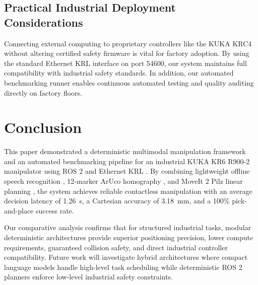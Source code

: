 \documentclass{svproc}
\begin{document}
\subsection{Practical Industrial Deployment Considerations}
Connecting external computing to proprietary controllers like the KUKA KRC4 without altering certified safety firmware is vital for factory adoption. By using the standard Ethernet KRL interface on port 54600, our system maintains full compatibility with industrial safety standards. In addition, our automated benchmarking runner enables continuous automated testing and quality auditing directly on factory floors.

\FloatBarrier
\section{Conclusion}
\label{sec:conclusion}

This paper demonstrated a deterministic multimodal manipulation framework and an automated benchmarking pipeline for an industrial KUKA KR6 R900-2 manipulator using ROS 2 \cite{ros2_2022} and Ethernet KRL \cite{kuka_eki2019}. By combining lightweight offline speech recognition \cite{vosk2020}, 12-marker ArUco homography \cite{aruco2014}, and MoveIt 2 \cite{moveit2014} Pilz linear planning \cite{pilz_motion2021}, the system achieves reliable contactless manipulation with an average decision latency of \SI{1.26}{\second}, a Cartesian accuracy of \SI{3.18}{\milli\meter}, and a 100\% pick-and-place success rate.

Our comparative analysis confirms that for structured industrial tasks, modular deterministic architectures provide superior positioning precision, lower compute requirements, guaranteed collision safety, and direct industrial controller compatibility. Future work will investigate hybrid architectures where compact language models handle high-level task scheduling while deterministic ROS 2 planners enforce low-level industrial safety constraints.
\end{document}
